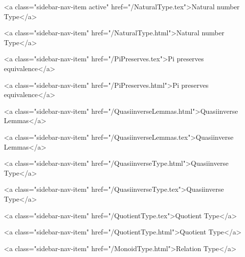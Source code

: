       
        
          <a class="sidebar-nav-item active" href="/NaturalType.tex">Natural number Type</a>
        
      
    
      
        
          <a class="sidebar-nav-item" href="/NaturalType.html">Natural number Type</a>
        
      
    
      
        
          <a class="sidebar-nav-item" href="/PiPreserves.tex">Pi preserves equivalence</a>
        
      
    
      
        
          <a class="sidebar-nav-item" href="/PiPreserves.html">Pi preserves equivalence</a>
        
      
    
      
        
          <a class="sidebar-nav-item" href="/QuasiinverseLemmas.html">Quasiinverse Lemmas</a>
        
      
    
      
        
          <a class="sidebar-nav-item" href="/QuasiinverseLemmas.tex">Quasiinverse Lemmas</a>
        
      
    
      
        
          <a class="sidebar-nav-item" href="/QuasiinverseType.html">Quasiinverse Type</a>
        
      
    
      
        
          <a class="sidebar-nav-item" href="/QuasiinverseType.tex">Quasiinverse Type</a>
        
      
    
      
        
          <a class="sidebar-nav-item" href="/QuotientType.tex">Quotient Type</a>
        
      
    
      
        
          <a class="sidebar-nav-item" href="/QuotientType.html">Quotient Type</a>
        
      
    
      
        
          <a class="sidebar-nav-item" href="/MonoidType.html">Relation Type</a>
        

